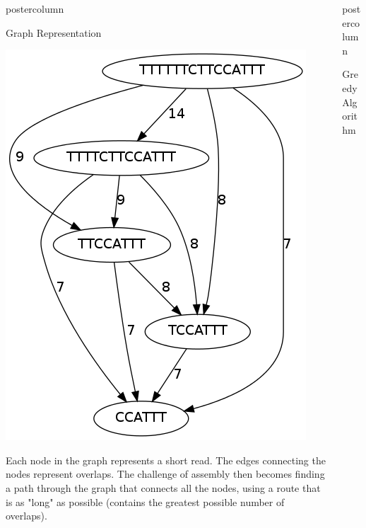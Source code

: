 \documentclass[final,hyperref={pdfpagelabels=false}]{beamer}
\newlength{\columnheight}
\begin{document}
\begin{frame}
\begin{columns}
\begin{column}{.32\textwidth}
\begin{beamercolorbox}[center,wd=\textwidth]{postercolumn}
\begin{minipage}[T]{.95\textwidth}
{\begin{block}{Graph Representation}
\begin{center}
                                \includegraphics[scale=0.75]{example_graph}
                            \end{center}
                            Each node in the graph represents a short read. The
                            edges connecting the nodes represent overlaps.  The
                            challenge of assembly then becomes finding a path
                            through the graph that connects all the nodes,
                            using a route that is as "long" as possible
                            (contains the greatest possible number of overlaps).
                       \end{block}
                } \end{minipage}
            \end{beamercolorbox}
        \end{column}
        \begin{column}{.32\textwidth}
            \begin{beamercolorbox}[center,wd=\textwidth]{postercolumn}
                \begin{minipage}[T]{.95\textwidth}
                    \parbox[t][\columnheight]{\textwidth}{
                        \begin{block}{Greedy Algorithm}

\end{block}}
\end{minipage}
\end{beamercolorbox}
\end{column}
\end{columns}
\end{frame}
\end{document}
